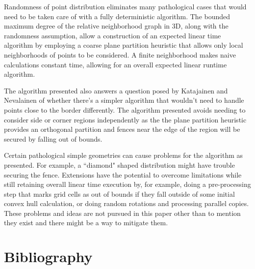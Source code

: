 \documentclass[a4paper,fleqn]{cas-dc}
\begin{document}
Randomness of point distribution eliminates many pathological cases that would need to be taken care of with
a fully deterministic algorithm.
The bounded maximum degree of the relative neighborhood graph in 3D, along with the randomness assumption, allow
a construction of an expected linear time algorithm by employing a coarse plane partition heuristic that allows
only local neighborhoods of points to be considered.
A finite neighborhood makes naive calculations constant time, allowing for an overall expected linear runtime algorithm.

The algorithm presented also answers a question posed by Katajainen and Nevalainen \cite{KN85} of whether there's a simpler
algorithm that wouldn't need to handle points close to the border differently.
The algorithm presented avoids needing to consider side or corner regions independently as the the plane partition
heuristic provides an orthogonal partition and fences near the edge of the region will be secured by falling out of
bounds.

Certain pathological simple geometries can cause problems for the algorithm as presented.
For example, a ``diamond" shaped distribution might have trouble securing the fence.
Extensions have the potential to overcome limitations while still retaining
overall linear time execution by,
for example, doing a pre-processing step
that marks grid cells as out of bounds if they fall outside of some initial convex hull calculation,
or doing random rotations and processing parallel copies.
These problems and ideas are not pursued in this paper other than to mention they exist and there might be
a way to mitigate them.






\section{Bibliography}
\end{document}
